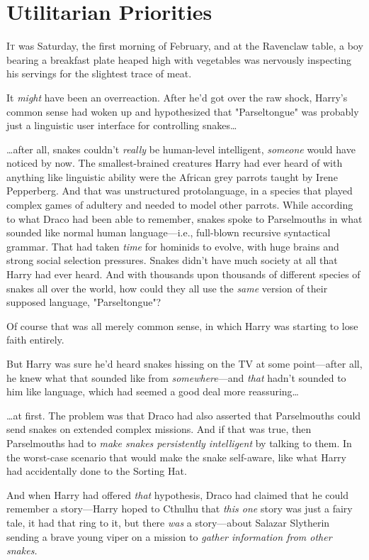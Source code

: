 \chapter{Utilitarian Priorities}

\lettrine{I}{t} was Saturday,
the first morning of February, and at the Ravenclaw table, a boy bearing a
breakfast plate heaped high with vegetables was nervously inspecting his
servings for the slightest trace of meat.

It \emph{might} have been an overreaction. After he’d got over the raw
shock, Harry’s common sense had woken up and hypothesized that "Parseltongue"
was probably just a linguistic user interface for controlling snakes…

…after all, snakes couldn’t \emph{really} be human-level intelligent,
\emph{someone} would have noticed by now. The smallest-brained creatures Harry
had ever heard of with anything like linguistic ability were the African grey
parrots taught by Irene Pepperberg. And that was unstructured protolanguage, in
a species that played complex games of adultery and needed to model other
parrots. While according to what Draco had been able to remember, snakes spoke
to Parselmouths in what sounded like normal human language—i.e., full-blown
recursive syntactical grammar. That had taken \emph{time} for hominids to
evolve, with huge brains and strong social selection pressures. Snakes didn’t
have much society at all that Harry had ever heard. And with thousands upon
thousands of different species of snakes all over the world, how could they all
use the \emph{same} version of their supposed language, "Parseltongue"?

Of course that was all merely common sense, in which Harry was starting to lose
faith entirely.

But Harry was sure he’d heard snakes hissing on the TV at some point—after
all, he knew what that sounded like from \emph{somewhere}—and \emph{that}
hadn’t sounded to him like language, which had seemed a good deal more
reassuring…

…at first. The problem was that Draco had also asserted that
Parselmouths could send snakes on extended complex missions. And if that was
true, then Parselmouths had to \emph{make snakes persistently intelligent} by
talking to them. In the worst-case scenario that would make the snake
self-aware, like what Harry had accidentally done to the Sorting Hat.

And when Harry had offered \emph{that} hypothesis, Draco had claimed that he
could remember a story—Harry hoped to Cthulhu that \emph{this one} story was
just a fairy tale, it had that ring to it, but there \emph{was} a story—about
Salazar Slytherin sending a brave young viper on a mission to \emph{gather
information from other snakes.}

